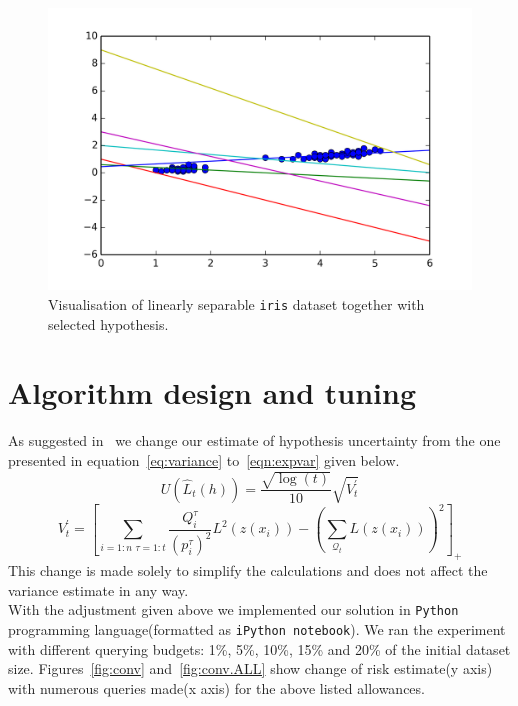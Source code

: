 \documentclass[12pt, a4paper, pdflatex, leqno, twoside]{report}
\begin{document}
\begin{figure}[htbp]
  \centering
  \includegraphics[width=0.7\linewidth]{graphics/gypothesis.png}
  \begin{tiny}
    \caption{Visualisation of linearly separable \texttt{iris} dataset together 
with selected hypothesis.\label{fig:hyp}}
  \end{tiny}
  \vspace{1cm}
\end{figure}

\section{Algorithm design and tuning}
As suggested in~\citep{DBLP:journals/corr/GantiG13} we change our estimate of 
hypothesis uncertainty from the one presented in equation~\ref{eq:variance} 
to~\ref{eqn:expvar} given below.\\
\begin{equation}
\label{eqn:expvar}
U(\hat{L}_t(h)) = \frac{ \sqrt{ \log(t) } }
                       { 10 }
                  \sqrt{ V^\prime_t }
\end{equation}
$$
V^\prime_t = \left[
  \sum_{i = 1:n \text{~} \tau = 1:t} \frac{Q^\tau_i}{(p^\tau_i)^2} L^2(z(x_i))
  -
  \left( \sum_{\mathscr{Q}_t} L(z(x_i)) \right)^2
\right]_+
$$
This change is made solely to simplify the calculations and does not affect the variance 
estimate in any way.\\

With the adjustment given above we implemented our solution in \texttt{Python} 
programming language(formatted as \texttt{iPython notebook}). We ran the 
experiment with different querying budgets: 1\%, 5\%, 10\%, 15\% and 20\% of 
the initial dataset size. Figures~\ref{fig:conv} and~\ref{fig:conv.ALL} show change 
of risk estimate(y axis) with numerous queries made(x axis) for the above listed allowances.\\
\end{document}
